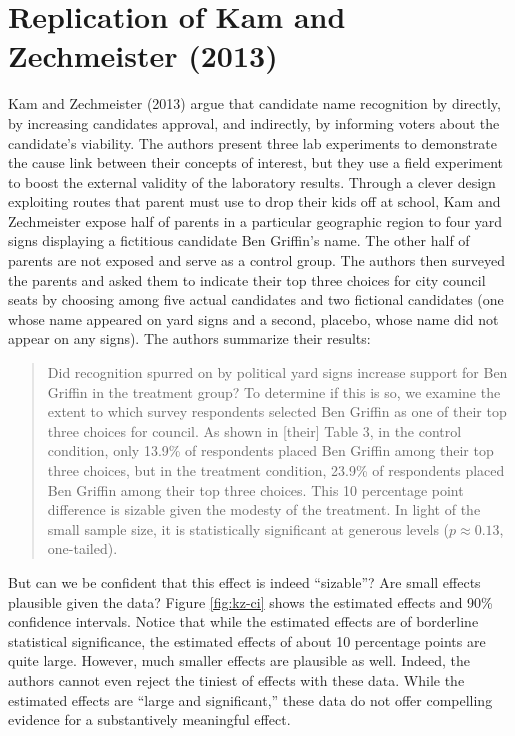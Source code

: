 \documentclass[12pt]{article}
\begin{document}
\section*{Replication of Kam and Zechmeister (2013)}

Kam and Zechmeister (2013) argue that candidate name recognition by directly, by increasing candidates approval, and indirectly, by informing voters about the candidate's viability. The authors present three lab experiments to demonstrate the cause link between their concepts of interest, but they use a field experiment to boost the external validity of the laboratory results. Through a clever design exploiting routes that parent must use to drop their kids off at school, Kam and Zechmeister expose half of parents in a particular geographic region to four yard signs displaying a fictitious candidate Ben Griffin's name. The other half of parents are not exposed and serve as a control group. The authors then surveyed the parents and asked them to indicate their top three choices for city council seats by choosing among five actual candidates and two fictional candidates (one whose name appeared on yard signs and a second, placebo, whose name did not appear on any signs). The authors summarize their results:

\begin{quote}
Did recognition spurred on by political yard signs increase support for Ben Griffin in the treatment group? To determine if this is so, we examine the extent to which survey respondents selected Ben Griffin as one of their top three choices for council. As shown in [their] Table 3, in the control condition, only 13.9\% of respondents placed Ben Griffin among their top three choices, but in the treatment condition, 23.9\% of respondents placed Ben Griffin among their top three choices. This 10 percentage point difference is sizable given the modesty of the treatment. In light of the small sample size, it is statistically significant at generous levels ($p \approx 0.13$, one-tailed).
\end{quote}

But can we be confident that this effect is indeed ``sizable''? Are small effects plausible given the data? Figure \ref{fig:kz-ci} shows the estimated effects and 90\% confidence intervals. Notice that while the estimated effects are of borderline statistical significance, the estimated effects of about 10 percentage points are quite large. However, much smaller effects are plausible as well. Indeed, the authors cannot even reject the tiniest of effects with these data. While the estimated effects are ``large and significant,'' these data do not offer compelling evidence for a substantively meaningful effect.
\end{document}

